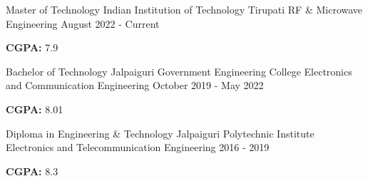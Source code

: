 

\begin{cventries}

  \cventry
    {Master of Technology} %
    {Indian Institution of Technology Tirupati} %
    {RF \& Microwave Engineering } %
    {August 2022 - Current} %
    {
      \begin{cvitems} %
        \item {\textbf{CGPA:} 7.9}
      \end{cvitems}
    }
    
  \cventry
    {Bachelor of Technology} %
    {Jalpaiguri Government Engineering College} %
    {Electronics and Communication Engineering} %
    {October 2019 - May 2022} %
    {
      \begin{cvitems} %
        \item {\textbf{CGPA:} 8.01}
      \end{cvitems}
    }

  \cventry
    {Diploma in Engineering \& Technology} %
    {Jalpaiguri Polytechnic Institute} %
    {Electronics and Telecommunication Engineering} %
    {2016 - 2019} %
    {
      \begin{cvitems} %
        \item {\textbf{CGPA:} 8.3}
      \end{cvitems}
    }


\end{cventries}
